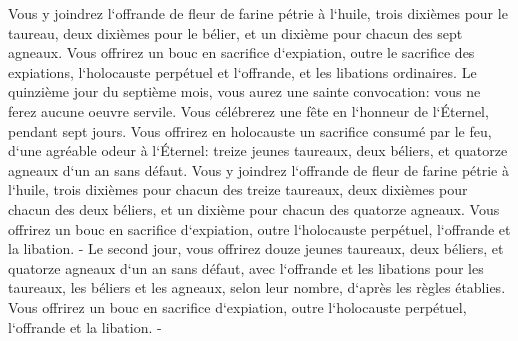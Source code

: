 \verse Vous y joindrez l`offrande de fleur de farine pétrie à l`huile, trois dixièmes pour le taureau, 
\verse deux dixièmes pour le bélier, et un dixième pour chacun des sept agneaux. 
\verse Vous offrirez un bouc en sacrifice d`expiation, outre le sacrifice des expiations, l`holocauste perpétuel et l`offrande, et les libations ordinaires. 
\verse Le quinzième jour du septième mois, vous aurez une sainte convocation: vous ne ferez aucune oeuvre servile. Vous célébrerez une fête en l`honneur de l`Éternel, pendant sept jours. 
\verse Vous offrirez en holocauste un sacrifice consumé par le feu, d`une agréable odeur à l`Éternel: treize jeunes taureaux, deux béliers, et quatorze agneaux d`un an sans défaut. 
\verse Vous y joindrez l`offrande de fleur de farine pétrie à l`huile, trois dixièmes pour chacun des treize taureaux, deux dixièmes pour chacun des deux béliers, 
\verse et un dixième pour chacun des quatorze agneaux. 
\verse Vous offrirez un bouc en sacrifice d`expiation, outre l`holocauste perpétuel, l`offrande et la libation. - 
\verse Le second jour, vous offrirez douze jeunes taureaux, deux béliers, et quatorze agneaux d`un an sans défaut, 
\verse avec l`offrande et les libations pour les taureaux, les béliers et les agneaux, selon leur nombre, d`après les règles établies. 
\verse Vous offrirez un bouc en sacrifice d`expiation, outre l`holocauste perpétuel, l`offrande et la libation. - 
